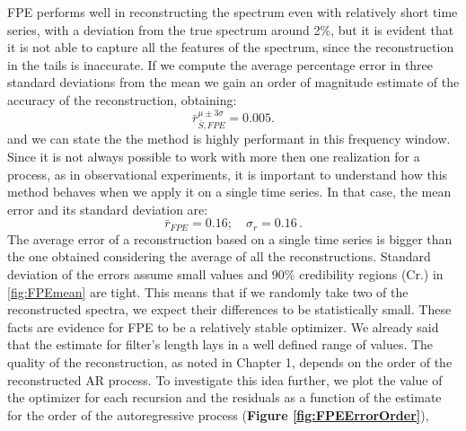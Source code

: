 \documentclass[twocolumn,showpacs,preprintnumbers,nofootinbib,prd,
superscriptaddress,10pt]{revtex4-1}
\begin{document}
FPE performs well in reconstructing the spectrum even with relatively short time series, with a deviation from the true spectrum around 2\%, but it is evident that it is not able to capture all the features of the spectrum, since the reconstruction in the tails is inaccurate. If we compute the average percentage error in three standard deviations from the mean we gain an order of magnitude estimate of the accuracy of the reconstruction, obtaining: 
\begin{equation}
    \nonumber
    \bar{r}_{\bar S, FPE}^{\mu \pm 3\sigma} = 0.005. 
\end{equation}
and we can state the the method is highly performant in this frequency window. 
Since it is not always possible to work with more then one realization for a process, as in observational experiments, it is important to understand how this method behaves when we apply it on a single time series. In that case, the mean error and its standard deviation are: 
\begin{equation}
    \nonumber
    \bar r_{FPE} = 0.16; \quad \sigma_{r} = 0.16\,.
\end{equation}
The average error of a reconstruction based on a single time series is bigger than the one obtained considering the average of all the reconstructions.
Standard deviation of the errors assume small values and 90\% credibility regions (Cr.) in \ref{fig:FPEmean} are tight. This means that if we randomly take two of the reconstructed spectra, we expect their differences to be statistically small. These facts are evidence for FPE to be a relatively stable optimizer. 
We already said that the estimate for filter's length lays in a well defined range of values. The quality of the reconstruction, as noted in Chapter 1, depends on the order of the reconstructed AR process. 
To investigate this idea further, we plot the value of the optimizer for each recursion and the residuals as a function of the estimate for the order of the autoregressive process (\textbf{Figure \ref{fig:FPEErrorOrder}}),
\end{document}
